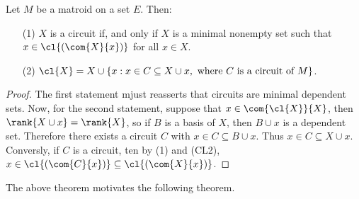 \begin{theorem}\label{1.4.8}
    Let $M$ be a matroid on a set  $E$. Then:
    \begin{enumerate}
        \item[(1)] $X$ is a circuit if, and only if  $X$ is a minimal nonempty
            set such that  $x \in \cl{(\com{X}{x})}$ for all $x \in X$.

        \item[(2)] $\cl{X}=X \cup \{x : x \in C \subseteq X \cup x,
            \text{ where } C \text{ is a circuit of } M\}$.
    \end{enumerate}
\end{theorem}
\begin{proof}
    The first statement mjust reasserts that circuits are minimal dependent
    sets. Now, for the second statement, suppose that $x \in \com{\cl{X}}{X}$,
    then $\rank{X \cup x}=\rank{X}$, so if $B$ is a basis of  $X$, then  $B \cup
    x$ is a dependent set. Therefore there exists a circuit  $C$ with  $x \in C
    \subseteq B \cup x$. Thus  $x \in C \subseteq X \cup x$. Conversly, if $C$
    is a circuit, ten by (1) and (CL2), $x \in \cl{(\com{C}{x})} \subseteq
    \cl{(\com{X}{x})}$.
\end{proof}

The above theorem motivates the following theorem.

